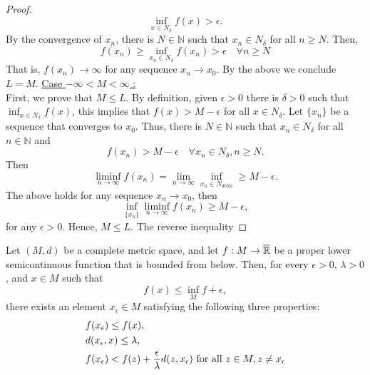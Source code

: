 \begin{proof}
        $$
            \inf_{x \in N_{\delta}} f(x) > \epsilon.
        $$
        By the convergence of $x_n$, there is $N \in \mathbb{N}$ such that 
        $x_n \in N_{\delta}$ for all $n \geq N$. Then, 
        $$
            f(x_n) \geq \inf_{x_n \in N_{\delta}} f(x_n) > %
            \epsilon \quad \forall n \geq N
        $$ 
        That is, $f(x_n) \to \infty$ for any sequence $x_n \to x_0$. By the above
        we conclude $L = M$.
        \underline{Case $ -\infty < M < \infty$ :} \\
        First, we prove that $M \leq L$. By definition, given $\epsilon>0$ there
        is $\delta >0$ such that $\inf_{x \in N_{\delta}} f(x)$, this implies that
        $f(x) > M - \epsilon$ for all $x \in N_{\delta}$. Let $\{x_n\}$ be a sequence
        that converges to $x_0$. Thus, there is $N \in \mathbb{N}$ such that 
        $x_n \in N_{\delta}$ for all $n \in \mathbb{N}$ and
        $$
            f(x_n) > M - \epsilon \quad \forall x_n \in N_{\delta}, n \geq N.
        $$
        Then
        $$
            \liminf_{n \to \infty} f(x_n) = \lim_{n \to \infty} \inf_{x_n \in N_{delta}} %
            \geq M - \epsilon.
        $$
        The above holds for any sequence $x_n \to x_0$, then
        $$
            \inf_{\{x_n\}} \liminf_{n \to \infty} f(x_n) \geq M - \epsilon,
        $$
        for any $\epsilon > 0$. Hence, $M \leq L$.
        The reverse inequality 
    \end{proof}
\begin{theorem}
    Let $(M, d)$ be a complete metric space, and let $f : M \to \overline{\mathbb{R}}$ be 
    a proper lower semicontinuous function that is bounded from below. Then, 
    for every $\epsilon > 0$, $\lambda > 0$, and $x \in M$ such that
    $$ 
        f(x) \leq \inf_{M} f + \epsilon,
    $$
    there exists an element $x_{\epsilon}\in M$ satisfying the following three 
    properties:
    \begin{align}
        & f(x_{\epsilon}) \leq f(x), \notag \\
        & d(x_{\epsilon}, x) \leq \lambda,  \\
        & f(x_{\epsilon}) < f(z) + \frac{\epsilon}{\lambda}d(z,x_{\epsilon})  %
         \text{ for all } z\in M, z \neq x_{\epsilon}\notag 
    \end{align}
\end{theorem}
